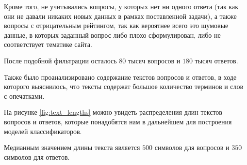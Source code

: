 \documentclass[../diploma.tex]{subfiles}
\begin{document}
	Кроме того, не учитывались вопросы, у которых нет ни одного ответа (так как они не давали никаких новых данных в рамках поставленной задачи), 
	а также вопросы с отрицательным рейтингом, так как вероятнее всего это шумовые данные, 
	в которых заданный вопрос либо плохо сформулирован, либо не соответствует тематике сайта.

	После подобной фильтрации осталось $80$ тысяч вопросов и $180$ тысяч ответов.

	Также было проанализировано содержание текстов вопросов и ответов, в ходе которого выяснилось, 
	что тексты содержат большое количество терминов и слов с опечатками.

	На рисунке \ref{fig:text_lengths} можно увидеть распределения длин текстов вопросов и ответов, 
	которые понадобятся нам в дальнейшем для построения моделей классификаторов.

	Медианным значением длины текста является $500$ символов для вопросов и $350$ символов для ответов.
\end{document}
